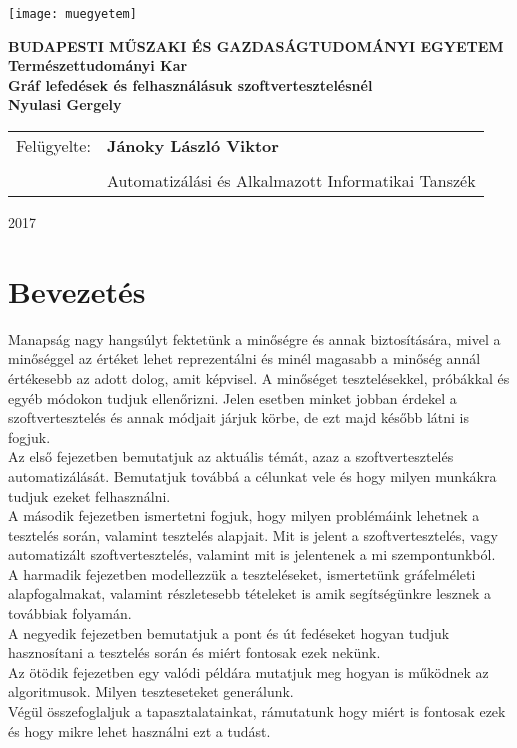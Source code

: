 \documentclass[12pt]{article}
\begin{document}
\begin{titlepage}
\centering
\texttt{[image: muegyetem]}

\bfseries\small{
BUDAPESTI MŰSZAKI ÉS GAZDASÁGTUDOMÁNYI EGYETEM
}\\
Természettudományi Kar\\
\vfill
\Large{Gráf lefedések és felhasználásuk szoftvertesztelésnél}\\
Nyulasi Gergely\\

\vfill
\vspace{4mm}
\begin{center}
\begin{tabular}{ll}
\normalsize Felügyelte: & \normalsize \textbf{Jánoky László Viktor}\\
& \normalsize \\
& \normalsize Automatizálási és Alkalmazott Informatikai Tanszék
\end{tabular} 
\end{center}
\vfill
2017
\end{titlepage}

\pagebreak

\tableofcontents

\pagebreak

\section{Bevezetés}

Manapság nagy hangsúlyt fektetünk a minőségre és annak biztosítására, mivel a minőséggel az értéket lehet reprezentálni és minél magasabb a minőség annál értékesebb az adott dolog, amit képvisel. A minőséget tesztelésekkel, próbákkal és egyéb módokon tudjuk ellenőrizni.
Jelen esetben minket jobban érdekel a szoftvertesztelés és annak módjait járjuk körbe, de ezt majd később látni is fogjuk.\\

Az első fejezetben bemutatjuk az aktuális témát, azaz a szoftvertesztelés automatizálását. Bemutatjuk továbbá a célunkat vele és hogy milyen munkákra tudjuk ezeket felhasználni.\\
A második fejezetben ismertetni fogjuk, hogy milyen problémáink lehetnek a tesztelés során, valamint tesztelés alapjait.
 Mit is jelent a szoftvertesztelés, vagy automatizált szoftvertesztelés, valamint mit is jelentenek a mi szempontunkból.\\
A harmadik fejezetben modellezzük a teszteléseket, ismertetünk gráfelméleti alapfogalmakat, valamint részletesebb tételeket is amik segítségünkre lesznek a továbbiak folyamán.\\
A negyedik fejezetben bemutatjuk a pont és út fedéseket hogyan tudjuk hasznosítani a tesztelés során és miért fontosak ezek nekünk.\\
Az ötödik fejezetben egy valódi példára mutatjuk meg hogyan is működnek az algoritmusok. Milyen teszteseteket generálunk.\\
Végül összefoglaljuk a tapasztalatainkat, rámutatunk hogy miért is fontosak ezek és hogy mikre lehet használni ezt a tudást.\\
\end{document}

